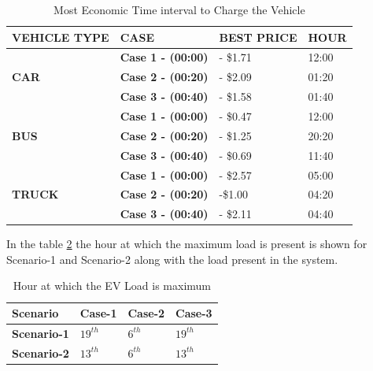 			\begin{table}[!h]
				\caption{Most Economic Time interval to Charge the Vehicle}
				\centering
			\begin{tabular}{|l|l|l|l|}
				\hline
				\textbf{VEHICLE TYPE}           & \textbf{CASE}         & \textbf{BEST PRICE} & \textbf{HOUR} \\ \hline
				\multirow{3}{*}{\textbf{CAR}}   & \textbf{Case 1 - (00:00)} & - \$1.71            & 12:00         \\ \cline{2-4} 
				& \textbf{Case 2 - (00:20)} & - \$2.09            & 01:20         \\ \cline{2-4} 
				& \textbf{Case 3 - (00:40)} & - \$1.58            & 01:40         \\ \hline
				\multirow{3}{*}{\textbf{BUS}}   & \textbf{Case 1 - (00:00)} & - \$0.47            & 12:00         \\ \cline{2-4} 
				& \textbf{Case 2 - (00:20)} & - \$1.25            & 20:20         \\ \cline{2-4} 
				& \textbf{Case 3 - (00:40)} & - \$0.69            & 11:40         \\ \hline
				\multirow{3}{*}{\textbf{TRUCK}} & \textbf{Case 1 - (00:00)} & - \$2.57            & 05:00         \\ \cline{2-4} 
				& \textbf{Case 2 - (00:20)} & -\$1.00             & 04:20         \\ \cline{2-4} 
				& \textbf{Case 3 - (00:40)} & - \$2.11            & 04:40         \\ \hline
			\end{tabular}
		\label{table:ec}
		\end{table}
		
		

	
		In the table \ref{table:whichbus} the hour at which the maximum load is present is shown for Scenario-1 and Scenario-2 along with the load present in the system.
		
			\begin{table}[!h]
			\centering
			\caption{Hour at which the EV Load is maximum }
			\begin{tabular}{|ll|ll|ll|ll|}
				\hline
				\multicolumn{2}{|l|}{\textbf{Scenario}} & \multicolumn{2}{l|}{\textbf{Case-1}} & \multicolumn{2}{l|}{\textbf{Case-2}} & \multicolumn{2}{l|}{\textbf{Case-3}} \\ \hline
				\multicolumn{2}{|l|}{\textbf{Scenario-1}}        & \multicolumn{2}{l|}{$ 19^{th} $}            & \multicolumn{2}{l|}{$ 6^{th} $}             & \multicolumn{2}{l|}{$ 19^{th} $}             \\ \hline
				\multicolumn{2}{|l|}{\textbf{Scenario-2}}        & \multicolumn{2}{l|}{$ 13^{th} $}           & \multicolumn{2}{l|}{$ 6^{th} $}             & \multicolumn{2}{l|}{$ 13^{th} $}             \\ \hline
			\end{tabular}
			\label{table:whichbus}
		\end{table}
	

